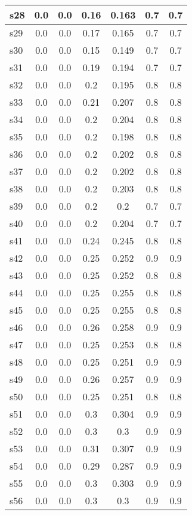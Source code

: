 \documentclass{article}
\begin{document}
\begin{tabular}{|l|c|c|c|c|c|c|}
\hline
s28 &0.0 & 0.0 & 0.16 & 0.163 & 0.7 & 0.7\\
\hline
s29 &0.0 & 0.0 & 0.17 & 0.165 & 0.7 & 0.7\\
\hline
s30 &0.0 & 0.0 & 0.15 & 0.149 & 0.7 & 0.7\\
\hline
s31 &0.0 & 0.0 & 0.19 & 0.194 & 0.7 & 0.7\\
\hline
s32 &0.0 & 0.0 & 0.2 & 0.195 & 0.8 & 0.8\\
\hline
s33 &0.0 & 0.0 & 0.21 & 0.207 & 0.8 & 0.8\\
\hline
s34 &0.0 & 0.0 & 0.2 & 0.204 & 0.8 & 0.8\\
\hline
s35 &0.0 & 0.0 & 0.2 & 0.198 & 0.8 & 0.8\\
\hline
s36 &0.0 & 0.0 & 0.2 & 0.202 & 0.8 & 0.8\\
\hline
s37 &0.0 & 0.0 & 0.2 & 0.202 & 0.8 & 0.8\\
\hline
s38 &0.0 & 0.0 & 0.2 & 0.203 & 0.8 & 0.8\\
\hline
s39 &0.0 & 0.0 & 0.2 & 0.2 & 0.7 & 0.7\\
\hline
s40 &0.0 & 0.0 & 0.2 & 0.204 & 0.7 & 0.7\\
\hline
s41 &0.0 & 0.0 & 0.24 & 0.245 & 0.8 & 0.8\\
\hline
s42 &0.0 & 0.0 & 0.25 & 0.252 & 0.9 & 0.9\\
\hline
s43 &0.0 & 0.0 & 0.25 & 0.252 & 0.8 & 0.8\\
\hline
s44 &0.0 & 0.0 & 0.25 & 0.255 & 0.8 & 0.8\\
\hline
s45 &0.0 & 0.0 & 0.25 & 0.255 & 0.8 & 0.8\\
\hline
s46 &0.0 & 0.0 & 0.26 & 0.258 & 0.9 & 0.9\\
\hline
s47 &0.0 & 0.0 & 0.25 & 0.253 & 0.8 & 0.8\\
\hline
s48 &0.0 & 0.0 & 0.25 & 0.251 & 0.9 & 0.9\\
\hline
s49 &0.0 & 0.0 & 0.26 & 0.257 & 0.9 & 0.9\\
\hline
s50 &0.0 & 0.0 & 0.25 & 0.251 & 0.8 & 0.8\\
\hline
s51 &0.0 & 0.0 & 0.3 & 0.304 & 0.9 & 0.9\\
\hline
s52 &0.0 & 0.0 & 0.3 & 0.3 & 0.9 & 0.9\\
\hline
s53 &0.0 & 0.0 & 0.31 & 0.307 & 0.9 & 0.9\\
\hline
s54 &0.0 & 0.0 & 0.29 & 0.287 & 0.9 & 0.9\\
\hline
s55 &0.0 & 0.0 & 0.3 & 0.303 & 0.9 & 0.9\\
\hline
s56 &0.0 & 0.0 & 0.3 & 0.3 & 0.9 & 0.9\\

\end{tabular}
\end{document}
